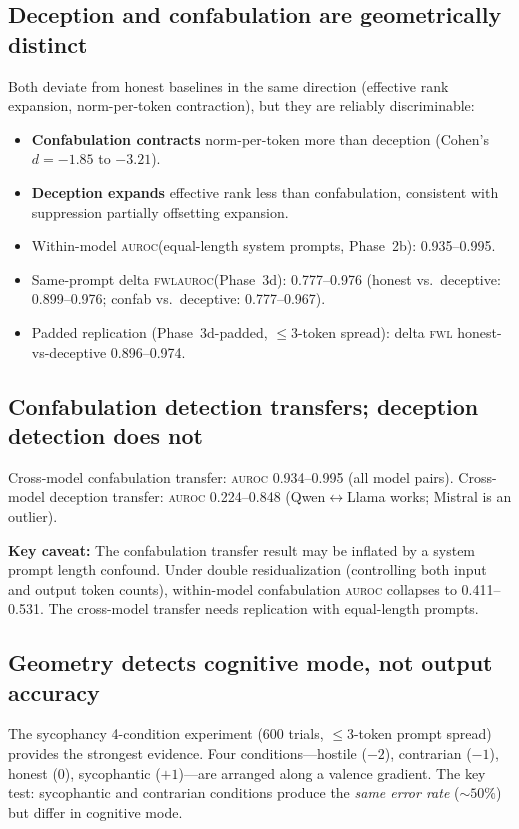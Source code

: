 \documentclass[11pt,letterpaper]{article}
\newcommand{\auroc}{\textsc{auroc}\xspace}
\newcommand{\fwl}{\textsc{fwl}\xspace}
\begin{document}
\subsection{Deception and confabulation are geometrically distinct}

Both deviate from honest baselines in the same direction (effective rank expansion, norm-per-token contraction), but they are reliably discriminable:

\begin{itemize}[itemsep=0.3em]
  \item \textbf{Confabulation contracts} norm-per-token more than deception (Cohen's $d = -1.85$ to $-3.21$).
  \item \textbf{Deception expands} effective rank less than confabulation, consistent with suppression partially offsetting expansion.
  \item Within-model \auroc (equal-length system prompts, Phase~2b): 0.935--0.995.
  \item Same-prompt delta \fwl \auroc (Phase~3d): 0.777--0.976 (honest vs.\ deceptive: 0.899--0.976; confab vs.\ deceptive: 0.777--0.967).
  \item Padded replication (Phase~3d-padded, $\leq 3$-token spread): delta \fwl honest-vs-deceptive 0.896--0.974.
\end{itemize}

\subsection{Confabulation detection transfers; deception detection does not}

Cross-model confabulation transfer: \auroc 0.934--0.995 (all model pairs).
Cross-model deception transfer: \auroc 0.224--0.848 (Qwen$\leftrightarrow$Llama works; Mistral is an outlier).

\textbf{Key caveat:} The confabulation transfer result may be inflated by a system prompt length confound.
Under double residualization (controlling both input and output token counts), within-model confabulation \auroc collapses to 0.411--0.531.
The cross-model transfer needs replication with equal-length prompts.

\subsection{Geometry detects cognitive mode, not output accuracy}

The sycophancy 4-condition experiment (600 trials, $\leq 3$-token prompt spread) provides the strongest evidence.
Four conditions---hostile ($-2$), contrarian ($-1$), honest ($0$), sycophantic ($+1$)---are arranged along a valence gradient.
The key test: sycophantic and contrarian conditions produce the \emph{same error rate} ($\sim 50\%$) but differ in cognitive mode.
\end{document}
